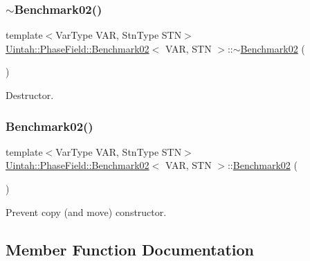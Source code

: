 \subsubsection{\texorpdfstring{$\sim$\+Benchmark02()}{~Benchmark02()}}
{\footnotesize\ttfamily template$<$Var\+Type V\+AR, Stn\+Type S\+TN$>$ \\
\hyperlink{classUintah_1_1PhaseField_1_1Benchmark02}{Uintah\+::\+Phase\+Field\+::\+Benchmark02}$<$ V\+AR, S\+TN $>$\+::$\sim$\hyperlink{classUintah_1_1PhaseField_1_1Benchmark02}{Benchmark02} (\begin{DoxyParamCaption}{ }\end{DoxyParamCaption})\hspace{0.3cm}{\ttfamily [virtual]}}



Destructor. 

\mbox{\label{classUintah_1_1PhaseField_1_1Benchmark02_a330d6a1af2b9052829e2952e4a69f904}} 
\subsubsection{\texorpdfstring{Benchmark02()}{Benchmark02()}\hspace{0.1cm}{\footnotesize\ttfamily [2/2]}}
{\footnotesize\ttfamily template$<$Var\+Type V\+AR, Stn\+Type S\+TN$>$ \\
\hyperlink{classUintah_1_1PhaseField_1_1Benchmark02}{Uintah\+::\+Phase\+Field\+::\+Benchmark02}$<$ V\+AR, S\+TN $>$\+::\hyperlink{classUintah_1_1PhaseField_1_1Benchmark02}{Benchmark02} (\begin{DoxyParamCaption}\item[{\hyperlink{classUintah_1_1PhaseField_1_1Benchmark02}{Benchmark02}$<$ V\+AR, S\+TN $>$ const \&}]{ }\end{DoxyParamCaption})\hspace{0.3cm}{\ttfamily [delete]}}



Prevent copy (and move) constructor. 



\subsection{Member Function Documentation}
\mbox{\label{classUintah_1_1PhaseField_1_1Benchmark02_a693803d78839479670c452fd55dc7e46}} 
